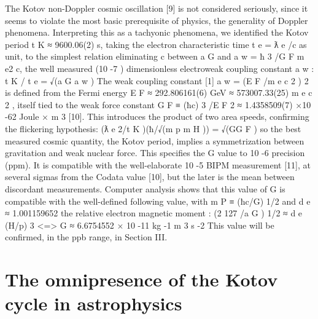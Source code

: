 The Kotov non-Doppler cosmic oscillation [9] is not considered seriously, since it seems to
violate the most basic prerequisite of physics, the generality of Doppler phenomena. Interpreting
this as a tachyonic phenomena, we identified the Kotov period t K ≈ 9600.06(2) s, taking the electron
characteristic time t e = ƛ e /c as unit, to the simplest relation eliminating c between a G and a w =
ħ 3 /G F m e2 c, the well measured (10 -7 ) dimensionless electroweak coupling constant a w :
t K / t e = √(a G a w )
The weak coupling constant [1] a w = (E F /m e c 2 ) 2 is defined from the Fermi energy E F ≈
292.806161(6) GeV ≈ 573007.33(25) m e c 2 , itself tied to the weak force constant G F ≡ (ħc) 3 /E F 2 ≈
1.4358509(7) ×10 -62 Joule × m 3 [10]. This introduces the product of two area speeds, confirming the
flickering hypothesis:
(ƛ e 2/t K )(ħ/√(m p m H )) = √(GG F )
so the best measured cosmic quantity, the Kotov period, implies a symmetrization between
gravitation and weak nuclear force. This specifies the G value to 10 -6 precision (ppm). It is
compatible with the well-elaborate 10 -5 BIPM measurement [11], at several sigmas from the Codata
value [10], but the later is the mean between discordant measurements.
Computer analysis shows that this value of G is compatible with the well-defined following
value, with m P ≡ (ħc/G) 1/2 and d e ≈ 1.001159652 the relative electron magnetic moment :
(2 127 /a G ) 1/2 ≈ d e (H/p) 3
<=> G ≈ 6.6754552 × 10 -11 kg -1 m 3 s -2
This value will be confirmed, in the ppb range, in Section III.

\section {The omnipresence of the Kotov cycle in astrophysics}

